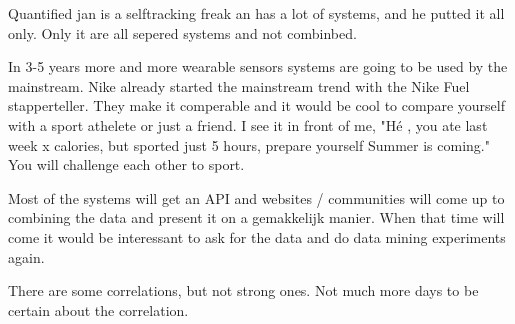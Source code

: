 	Quantified jan is a selftracking freak an has a lot of systems, and he putted it all only. Only it are all sepered systems and not combinbed.

	In 3-5 years more and more wearable sensors systems are going to be used by the mainstream. Nike already started the mainstream trend with the Nike Fuel stapperteller. They make it comperable and it would be cool to compare yourself with a sport athelete or just a friend. I see it in front of me, "Hé , you ate last week x calories, but sported just 5 hours, prepare yourself Summer is coming." You will challenge each other to sport. 

	Most of the systems will get an API and websites / communities will come up to combining the data and present it on a gemakkelijk manier. When that time will come it would be interessant to ask for the data and do data mining experiments again. 


	There are some correlations, but not strong ones. Not much more days to be certain about the correlation.
	\fi
